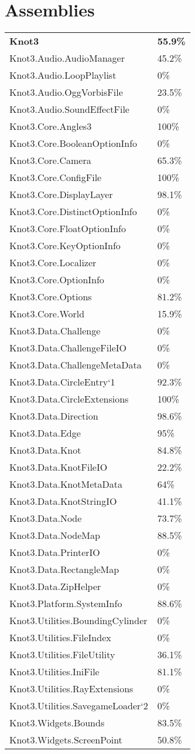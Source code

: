 \documentclass[a4paper,10pt]{article}
\begin{document}
\section{Assemblies}
\begin{longtable}[l]{ll}
\textbf{Knot3} & \textbf{55.9\%}\\
Knot3.Audio.AudioManager & 45.2\%\\
Knot3.Audio.LoopPlaylist & 0\%\\
Knot3.Audio.OggVorbisFile & 23.5\%\\
Knot3.Audio.SoundEffectFile & 0\%\\
Knot3.Core.Angles3 & 100\%\\
Knot3.Core.BooleanOptionInfo & 0\%\\
Knot3.Core.Camera & 65.3\%\\
Knot3.Core.ConfigFile & 100\%\\
Knot3.Core.DisplayLayer & 98.1\%\\
Knot3.Core.DistinctOptionInfo & 0\%\\
Knot3.Core.FloatOptionInfo & 0\%\\
Knot3.Core.KeyOptionInfo & 0\%\\
Knot3.Core.Localizer & 0\%\\
Knot3.Core.OptionInfo & 0\%\\
Knot3.Core.Options & 81.2\%\\
Knot3.Core.World & 15.9\%\\
Knot3.Data.Challenge & 0\%\\
Knot3.Data.ChallengeFileIO & 0\%\\
Knot3.Data.ChallengeMetaData & 0\%\\
Knot3.Data.CircleEntry`1 & 92.3\%\\
Knot3.Data.CircleExtensions & 100\%\\
Knot3.Data.Direction & 98.6\%\\
Knot3.Data.Edge & 95\%\\
Knot3.Data.Knot & 84.8\%\\
Knot3.Data.KnotFileIO & 22.2\%\\
Knot3.Data.KnotMetaData & 64\%\\
Knot3.Data.KnotStringIO & 41.1\%\\
Knot3.Data.Node & 73.7\%\\
Knot3.Data.NodeMap & 88.5\%\\
Knot3.Data.PrinterIO & 0\%\\
Knot3.Data.RectangleMap & 0\%\\
Knot3.Data.ZipHelper & 0\%\\
Knot3.Platform.SystemInfo & 88.6\%\\
Knot3.Utilities.BoundingCylinder & 0\%\\
Knot3.Utilities.FileIndex & 0\%\\
Knot3.Utilities.FileUtility & 36.1\%\\
Knot3.Utilities.IniFile & 81.1\%\\
Knot3.Utilities.RayExtensions & 0\%\\
Knot3.Utilities.SavegameLoader`2 & 0\%\\
Knot3.Widgets.Bounds & 83.5\%\\
Knot3.Widgets.ScreenPoint & 50.8\%\\
\end{longtable}
\newpage
\end{document}
